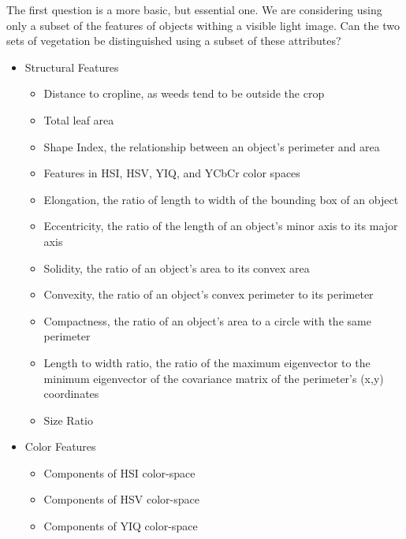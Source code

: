 \documentclass[12pt]{article}
\begin{document}
The first question is a more basic, but essential one. We are considering using only a subset of the features of objects withing a visible light image. Can the two sets of vegetation be distinguished using a subset of these attributes?
\begin{itemize}
	\item{Structural Features}
	\begin{itemize}
		\item{Distance to cropline, as weeds tend to be outside the crop}
		\item{Total leaf area}
		\item{Shape Index, the relationship between an object's perimeter and area}
		\item{Features in HSI, HSV, YIQ, and YCbCr color spaces}
		\item{Elongation, the ratio of length to width of the bounding box of an object}
		\item{Eccentricity, the ratio of the length of an object's minor axis to its major axis}
		\item{Solidity, the ratio of an object's area to its convex area}
		\item{Convexity, the ratio of an object's convex perimeter to its perimeter}
		\item{Compactness, the ratio of an object's area to a circle with the same perimeter}
		\item{Length to width ratio, the ratio of the maximum eigenvector to the minimum eigenvector of the covariance matrix of the perimeter's (x,y) coordinates}
		\item{Size Ratio}
	\end{itemize}
	\item{Color Features}
	\begin{itemize}
		\item{Components of HSI color-space}
		\item{Components of HSV color-space}
		\item{Components of YIQ color-space}
	\end{itemize}
\end{itemize}
\end{document}
